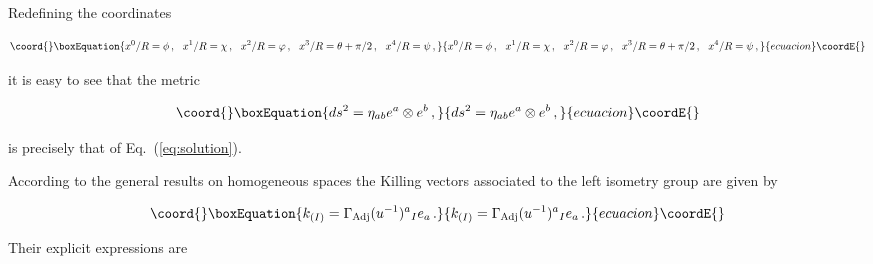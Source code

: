 \documentclass[12pt,a4paper]{article}
\begin{document}
Redefining the coordinates

\begin{equation}\coord{}\boxEquation{
x^{0}/R = \phi\, ,
\,\,\,\,
x^{1}/R = \chi\, ,
\,\,\,\,
x^{2}/R = \varphi\, ,
\,\,\,\,
x^{3}/R = \theta +\pi/2\, ,
\,\,\,\,
x^{4}/R=\psi\, ,
}{
x^{0}/R = \phi\, ,
\,\,\,\,
x^{1}/R = \chi\, ,
\,\,\,\,
x^{2}/R = \varphi\, ,
\,\,\,\,
x^{3}/R = \theta +\pi/2\, ,
\,\,\,\,
x^{4}/R=\psi\, ,
}{ecuacion}\coordE{}\end{equation}

\noindent
it is easy to see that the metric

\begin{equation}\coord{}\boxEquation{
ds^{2}= \eta_{ab}e^{a}\otimes e^{b}\, ,  
}{
ds^{2}= \eta_{ab}e^{a}\otimes e^{b}\, ,  
}{ecuacion}\coordE{}\end{equation}

\noindent
is precisely that of Eq.~(\ref{eq:solution}).

According to the general results on homogeneous spaces the Killing
vectors \coordHE{} associated to the left isometry group
\coordHE{} are given by

\begin{equation}\coord{}\boxEquation{
k_{(I)}=\Gamma_{\rm Adj}(u^{-1})^{a}{}_{I} e_{a}\, .
}{
k_{(I)}=\Gamma_{\rm Adj}(u^{-1})^{a}{}_{I} e_{a}\, .
}{ecuacion}\coordE{}\end{equation}

Their explicit expressions are 
\end{document}
